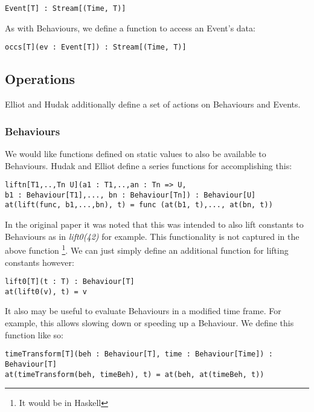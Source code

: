 \begin{verbatim}
Event[T] : Stream[(Time, T)]
\end{verbatim}
        
        As with Behaviours, we define a function to access an Event's data:
        
\begin{verbatim}
occs[T](ev : Event[T]) : Stream[(Time, T)]
\end{verbatim}
       
    \subsection{Operations}
      Elliot and Hudak additionally define a set of actions on Behaviours and Events.
      
      \subsubsection{Behaviours}
        We would like functions defined on static values to also be available to Behaviours. Hudak
        and Elliot define a series functions for accomplishing this:
        
\begin{verbatim}
liftn[T1,..,Tn U](a1 : T1,..,an : Tn => U, 
b1 : Behaviour[T1],..., bn : Behaviour[Tn]) : Behaviour[U]
at(lift(func, b1,...,bn), t) = func (at(b1, t),..., at(bn, t))
\end{verbatim}

      In the original paper it was noted that this was intended to also lift constants to Behaviours
      as in \emph{lift0(42)} for example. This functionality is not captured in the above function \footnote{It would
      be in Haskell}. We can just simply define an additional function for lifting constants however:

\begin{verbatim}
lift0[T](t : T) : Behaviour[T]
at(lift0(v), t) = v
\end{verbatim}
        
       It also may be useful to evaluate Behaviours in a modified time frame. For example, this allows
       slowing down or speeding up a Behaviour. We define this function like so:

\begin{verbatim}
timeTransform[T](beh : Behaviour[T], time : Behaviour[Time]) : Behaviour[T]
at(timeTransform(beh, timeBeh), t) = at(beh, at(timeBeh, t))
\end{verbatim}
        
